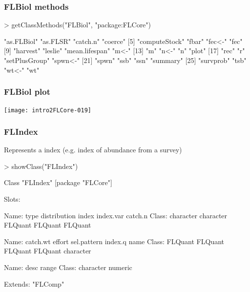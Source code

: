 \documentclass{beamer}%
\begin{document}
\begin{frame}[containsverbatim]
  \frametitle{FLBiol methods}

{\tiny{
\begin{Schunk}
\begin{Sinput}
> getClassMethods("FLBiol", "package:FLCore")
\end{Sinput}
\begin{Soutput}
 [1] "as.FLBiol"     "as.FLSR"       "catch.n"       "coerce"       
 [5] "computeStock"  "fbar"          "fec<-"         "fec"          
 [9] "harvest"       "leslie"        "mean.lifespan" "m<-"          
[13] "m"             "n<-"           "n"             "plot"         
[17] "rec"           "r"             "setPlusGroup"  "spwn<-"       
[21] "spwn"          "ssb"           "ssn"           "summary"      
[25] "survprob"      "tsb"           "wt<-"          "wt"           
\end{Soutput}
\end{Schunk}
}}

\end{frame}

\begin{frame}
  \frametitle{FLBiol plot}

\texttt{[image: intro2FLCore-019]}

\end{frame}

\begin{frame}[containsverbatim]
  \frametitle{FLIndex}
Represents a index (e.g. index of abundance from a survey)
{\tiny{
\begin{Schunk}
\begin{Sinput}
> showClass("FLIndex")
\end{Sinput}
\begin{Soutput}
Class "FLIndex" [package "FLCore"]

Slots:
                                                                       
Name:          type distribution        index    index.var      catch.n
Class:    character    character      FLQuant      FLQuant      FLQuant
                                                                       
Name:      catch.wt       effort  sel.pattern      index.q         name
Class:      FLQuant      FLQuant      FLQuant      FLQuant    character
                                
Name:          desc        range
Class:    character      numeric

Extends: "FLComp"
\end{Soutput}
\end{Schunk}
}}

\end{frame}
\end{document}

